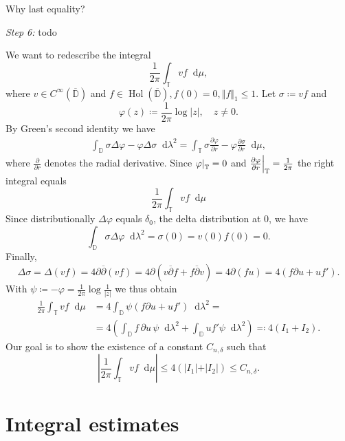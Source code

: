 \documentclass[letterpaper, 11pt]{article}
\newcommand{\D}{\mathbb{D}}
\newcommand{\T}{\mathbb{T}}
\newcommand{\1}{\mathds{1}}
\newcommand{\diff}{\mathop{}\!\mathrm{d}}
\newcommand{\cl}[1]{\overline{#1}}
\newcommand{\restr}[2]{{%
  \left.\kern-\nulldelimiterspace %
  #1 %
  \littletaller %
  \right|_{#2} %
  }}
\newcommand{\littletaller}{\mathchoice{\vphantom{\big|}}{}{}{}}
\newcommand{\wirtz}{\partial}
\newcommand{\wirtzbar}{\overline{\partial}}
\DeclareMathOperator*{\Hol}{Hol}
\newcommand{\todo}[1][Todo.]{{\color{red} #1}}
\theoremstyle{definition}
\newenvironment{innerproof}
 {\renewcommand{\qedsymbol}{}\proof}
 {\endproof}
\begin{document}
\todo[Why last equality?]

\begin{innerproof}[Proof (continued)] \textit{Step 6:} todo

  We want to redescribe the integral
  $$ \frac{1}{2\pi} \int_\T v f \diff \mu, $$
  where $v \in C^\infty(\cl{\D})$ and $f \in \Hol(\cl{\D}), f(0) = 0, \Vert f \Vert_1 \leq 1$. Let $\sigma \coloneqq v f$ and
  $$ \varphi(z) \coloneqq \frac{1}{2\pi} \log \vert z \vert, \quad z \neq 0. $$
  By Green's second identity we have
  \begin{align*}
    \int_\D \sigma \Delta \varphi - \varphi \Delta \sigma \diff \lambda^2 = \int_\T \sigma \frac{\partial \varphi}{\partial r} - \varphi \frac{\partial \sigma}{\partial r} \diff \mu,
  \end{align*}
  where $\frac{\partial}{\partial r}$ denotes the radial derivative.
  Since $\restr{\varphi}{\T} = 0$ and $\restr{\frac{\partial \varphi}{\partial r}}{\T} = \frac{1}{2 \pi}$ the right integral equals
  $$ \frac{1}{2 \pi} \int_\T v f \diff \mu $$
  Since distributionally $\Delta \varphi$ equals $\delta_0$, the delta distribution at 0, we have
  $$ \int_\D \sigma \Delta \varphi \diff \lambda^2 = \sigma(0) = v(0) f(0) = 0. $$
  Finally,
  $$ \Delta \sigma = \Delta (v f) = 4 \wirtz \wirtzbar (v f) = 4 \wirtz (v \wirtzbar f + f \wirtzbar v) = 4\wirtz(f u) = 4(f \partial u + u f'). $$
  With $\psi \coloneqq -\varphi = \frac{1}{2\pi} \log \frac{1}{\vert z \vert}$ we thus obtain
  \begin{align*}
    \frac{1}{2 \pi} \int_\T v f \diff \mu &= 4 \int_\D \psi \left( f \partial u + u f' \right) \diff \lambda^2 = \\ 
    &= 4 \left( \int_\D f \, \partial u \, \psi \diff \lambda^2 + \int_\D u f' \psi \diff \lambda^2 \right) \eqqcolon 4 (I_1 + I_2).
  \end{align*}
  Our goal is to show the existence of a constant $C_{n,\delta}$ such that
  $$ \left\vert \frac{1}{2 \pi} \int_\T v f \diff \mu \right\vert \leq 4 (\vert I_1 \vert + \vert I_2 \vert) \leq C_{n,\delta}. $$
\end{innerproof}

\section{Integral estimates}
\end{document}
